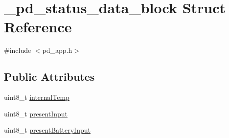 \hypertarget{struct__pd__status__data__block}{\section{\-\_\-pd\-\_\-status\-\_\-data\-\_\-block Struct Reference}
\label{struct__pd__status__data__block}
}


{\ttfamily \#include $<$pd\-\_\-app.\-h$>$}

\subsection*{Public Attributes}
\begin{DoxyCompactItemize}
\item 
uint8\-\_\-t \hyperlink{struct__pd__status__data__block_a703addd9acd9c9208aee4b610cdcfee0}{internal\-Temp}
\item 
uint8\-\_\-t \hyperlink{struct__pd__status__data__block_a73ce40cf713642d43b807c9e6f7c0915}{present\-Input}
\item 
uint8\-\_\-t \hyperlink{struct__pd__status__data__block_a39291ac6c1e754c78545ec755ad12073}{present\-Battery\-Input}
\end{DoxyCompactItemize}


